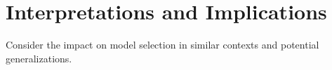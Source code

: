\section{Interpretations and Implications}
Consider the impact on model selection in similar contexts and potential generalizations.